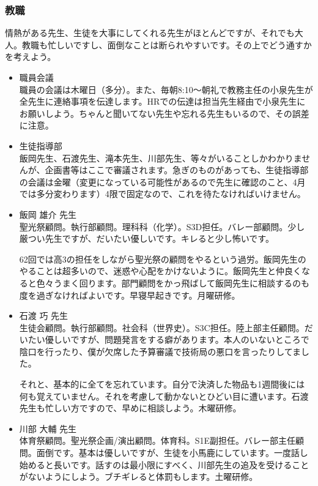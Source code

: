 \documentclass[dvipdfmx,jb5]{jarticle}
\begin{document}
\subsubsection{教職}
情熱がある先生、生徒を大事にしてくれる先生がほとんどですが、それでも大人。教職も忙しいですし、面倒なことは断られやすいです。その上でどう通すかを考えよう。
\begin{itemize}
  \item 職員会議\\
  職員の会議は木曜日（多分）。また、毎朝8:10〜朝礼で教務主任の小泉先生が全先生に連絡事項を伝達します。HRでの伝達は担当先生経由で小泉先生にお願いしよう。ちゃんと聞いてない先生や忘れる先生もいるので、その誤差に注意。

  \item 生徒指導部\\
  飯岡先生、石渡先生、滝本先生、川部先生、等々がいることしかわかりませんが、企画書等はここで審議されます。急ぎのものがあっても、生徒指導部の会議は金曜（変更になっている可能性があるので先生に確認のこと、4月では多分変わります）4限で固定なので、これを待たなければいけません。

  \item 飯岡 雄介 先生\\
  聖光祭顧問。執行部顧問。理科科（化学）。S3D担任。バレー部顧問。少し厳つい先生ですが、だいたい優しいです。キレると少し怖いです。

  62回では高3の担任をしながら聖光祭の顧問をやるという過労。飯岡先生のやることは超多いので、迷惑や心配をかけないように。飯岡先生と仲良くなると色々うまく回ります。部門顧問をかっ飛ばして飯岡先生に相談するのも度を過ぎなければよいです。早寝早起きです。月曜研修。

  \item 石渡 巧 先生\\
  生徒会顧問。執行部顧問。社会科（世界史）。S3C担任。陸上部主任顧問。だいたい優しいですが、問題発言をする癖があります。本人のいないところで陰口を行ったり、僕が欠席した予算審議で技術局の悪口を言ったりしてました。

  それと、基本的に全てを忘れています。自分で決済した物品も1週間後には何も覚えていません。それを考慮して動かないとひどい目に遭います。石渡先生も忙しい方ですので、早めに相談しよう。木曜研修。

  \item 川部 大輔 先生\\
  体育祭顧問。聖光祭企画/演出顧問。体育科。S1E副担任。バレー部主任顧問。面倒です。基本は優しいですが、生徒を小馬鹿にしています。一度話し始めると長いです。話すのは最小限にすべく、川部先生の追及を受けることがないようにしよう。ブチギレると体罰もします。土曜研修。


\end{itemize}
\end{document}

